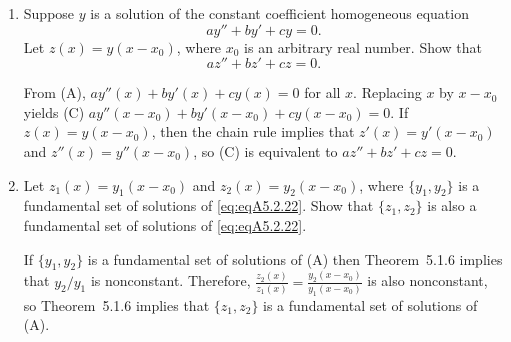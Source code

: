 \documentclass{ximera}
\begin{document}
\begin{problem}\label{exer:5.2.22}
\begin{enumerate}
\item %
Suppose $y$  is a solution of the constant coefficient homogeneous
equation \begin{equation}\label{eq:eqA5.2.22}
ay''+by'+cy=0.
\end{equation}
Let $z(x)=y(x-x_0)$, where $x_0$ is an arbitrary real number.
Show that
$$
az''+bz'+cz=0.
$$
\begin{solution}
From (A), $ay''(x)+by'(x)+cy(x)=0$ for all $x$. Replacing $x$ by
$x-x_0$ yields (C) $ay''(x-x_0)+by'(x-x_0)+cy(x-x_0)=0$. If
$z(x)=y(x-x_0)$, then the chain rule implies that $z'(x)=y'(x-x_0)$
and $z''(x)=y''(x-x_0)$, so (C) is equivalent to $az''+bz'+cz=0$.
\end{solution}

\item %
Let $z_1(x)=y_1(x-x_0)$ and $z_2(x)=y_2(x-x_0)$, where $\{y_1,y_2\}$
is a fundamental set of solutions of \ref{eq:eqA5.2.22}. Show that
$\{z_1,z_2\}$ is also a fundamental set of solutions of
\ref{eq:eqA5.2.22}.
\begin{solution}
 If  $\{y_1,y_2\}$  is a fundamental set of solutions of
(A) then Theorem~5.1.6  implies that
$y_2/y_1$ is nonconstant. Therefore,
$\frac{z_2(x)}{z_1(x)}=\frac{y_2(x-x_0)}{y_1(x-x_0)}$ is also
nonconstant, so Theorem~5.1.6 implies that  $\{z_1,z_2\}$ is a
fundamental set of solutions of (A).
\end{solution}


\end{enumerate}
\end{problem}
\end{document}
